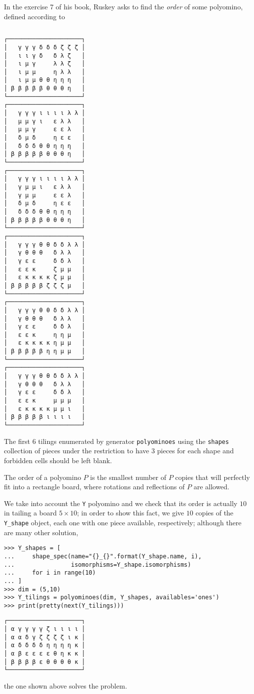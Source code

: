 In the exercise 7 of his book, Ruskey asks to find the \textit{order} of some
polyomino, defined according to
\begin{margintable}%
\inputminted[baselinestretch=0.8]{python}{backtracking/pentominoes-regular-snippet.py}
\begin{Verbatim}[baselinestretch=0.1]
┌─────────────────────┐
│   γ γ γ δ δ δ ζ ζ ζ │
│   ι ι γ δ   δ λ ζ   │
│   ι μ γ     λ λ ζ   │
│   ι μ μ     η λ λ   │
│   ι μ μ θ θ η η η   │
│ β β β β β θ θ θ η   │
└─────────────────────┘
┌─────────────────────┐
│   γ γ γ ι ι ι ι λ λ │
│   μ μ γ ι   ε λ λ   │
│   μ μ γ     ε ε λ   │
│   δ μ δ     η ε ε   │
│   δ δ δ θ θ η η η   │
│ β β β β β θ θ θ η   │
└─────────────────────┘
┌─────────────────────┐
│   γ γ γ ι ι ι ι λ λ │
│   γ μ μ ι   ε λ λ   │
│   γ μ μ     ε ε λ   │
│   δ μ δ     η ε ε   │
│   δ δ δ θ θ η η η   │
│ β β β β β θ θ θ η   │
└─────────────────────┘
┌─────────────────────┐
│   γ γ γ θ θ δ δ λ λ │
│   γ θ θ θ   δ λ λ   │
│   γ ε ε     δ δ λ   │
│   ε ε κ     ζ μ μ   │
│   ε κ κ κ κ ζ μ μ   │
│ β β β β β ζ ζ ζ μ   │
└─────────────────────┘
┌─────────────────────┐
│   γ γ γ θ θ δ δ λ λ │
│   γ θ θ θ   δ λ λ   │
│   γ ε ε     δ δ λ   │
│   ε ε κ     η η μ   │
│   ε κ κ κ κ η μ μ   │
│ β β β β β η η μ μ   │
└─────────────────────┘
┌─────────────────────┐
│   γ γ γ θ θ δ δ λ λ │
│   γ θ θ θ   δ λ λ   │
│   γ ε ε     δ δ λ   │
│   ε ε κ     μ μ μ   │
│   ε κ κ κ κ μ μ ι   │
│ β β β β β ι ι ι ι   │
└─────────────────────┘
\end{Verbatim}
\caption{The first $6$ tilings enumerated by generator \texttt{polyominoes}
using the \texttt{shapes} collection of pieces under the restriction to
have $3$ pieces for each shape and forbidden cells should be left blank.}
\label{tbl:pentominoes:with:restrictions}
\end{margintable}

\begin{definition}
The order of a polyomino $P$ is the smallest number of $P$ copies that will
perfectly fit into a rectangle board, where rotations and reflections of $P$
are allowed.
\end{definition}

We take into account the \verb|Y| polyomino and we check that its order is
actually $10$ in tailing a board $5\times 10$; in order to show this fact, we
give $10$ copies of the \verb|Y_shape| object, each one with one piece
available, respectively; although there are many other solution,
\begin{verbatim}
>>> Y_shapes = [
...     shape_spec(name="{}_{}".format(Y_shape.name, i),
...                isomorphisms=Y_shape.isomorphisms)
...     for i in range(10)
... ]
>>> dim = (5,10)
>>> Y_tilings = polyominoes(dim, Y_shapes, availables='ones')
>>> print(pretty(next(Y_tilings)))
\end{verbatim}
\begin{Verbatim}[baselinestretch=0.1]
┌─────────────────────┐
│ α γ γ γ γ ζ ι ι ι ι │
│ α α δ γ ζ ζ ζ ζ ι κ │
│ α δ δ δ δ η η η η κ │
│ α β ε ε ε ε θ η κ κ │
│ β β β β ε θ θ θ θ κ │
└─────────────────────┘
\end{Verbatim}
the one shown above solves the problem.

